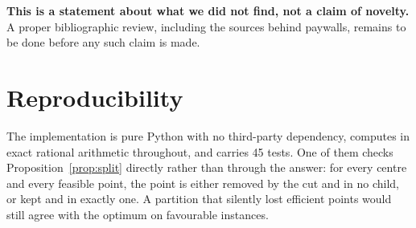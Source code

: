 \documentclass[11pt,a4paper]{article}
\begin{document}
\textbf{This is a statement about what we did not find, not a claim of
novelty.} A proper bibliographic review, including the sources behind
paywalls, remains to be done before any such claim is made.

\section{Reproducibility}

The implementation is pure Python with no third-party dependency, computes in
exact rational arithmetic throughout, and carries 45 tests. One of them checks
Proposition~\ref{prop:split} directly rather than through the answer: for every
centre and every feasible point, the point is either removed by the cut and in
no child, or kept and in exactly one. A partition that silently lost efficient
points would still agree with the optimum on favourable instances.
\end{document}
